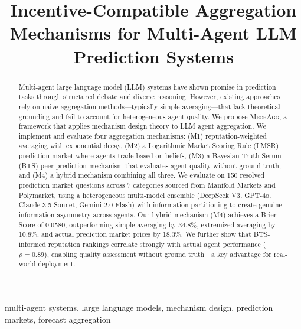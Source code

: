 \documentclass[conference]{IEEEtran}
\newcommand{\method}{\textsc{MechAgg}}
\begin{document}
\title{Incentive-Compatible Aggregation Mechanisms for Multi-Agent LLM Prediction Systems}

\author{
\IEEEauthorblockA{
}
}

\maketitle

\begin{abstract}
Multi-agent large language model (LLM) systems have shown promise in prediction tasks through structured debate and diverse reasoning. However, existing approaches rely on naive aggregation methods---typically simple averaging---that lack theoretical grounding and fail to account for heterogeneous agent quality. We propose \method{}, a framework that applies mechanism design theory to LLM agent aggregation. We implement and evaluate four aggregation mechanisms: (M1) reputation-weighted averaging with exponential decay, (M2) a Logarithmic Market Scoring Rule (LMSR) prediction market where agents trade based on beliefs, (M3) a Bayesian Truth Serum (BTS) peer prediction mechanism that evaluates agent quality without ground truth, and (M4) a hybrid mechanism combining all three. We evaluate on 150 resolved prediction market questions across 7 categories sourced from Manifold Markets and Polymarket, using a heterogeneous multi-model ensemble (DeepSeek V3, GPT-4o, Claude 3.5 Sonnet, Gemini 2.0 Flash) with information partitioning to create genuine information asymmetry across agents. Our hybrid mechanism (M4) achieves a Brier Score of 0.0580, outperforming simple averaging by 34.8\%, extremized averaging by 10.8\%, and actual prediction market prices by 18.3\%. We further show that BTS-informed reputation rankings correlate strongly with actual agent performance ($\rho = 0.89$), enabling quality assessment without ground truth---a key advantage for real-world deployment.
\end{abstract}

\begin{IEEEkeywords}
multi-agent systems, large language models, mechanism design, prediction markets, forecast aggregation
\end{IEEEkeywords}


\end{document}
